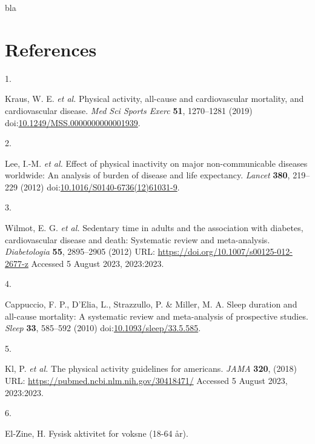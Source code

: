 \documentclass[
  9pt,
]{scrbook}
\newlength{\cslhangindent}
\newlength{\csllabelwidth}
\newlength{\cslentryspacingunit} %
\newenvironment{CSLReferences}[2] %
 {%
  \setlength{\parindent}{0pt}
  \ifodd #1
  \let\oldpar\par
  \def\par{\hangindent=\cslhangindent\oldpar}
  \fi
  \setlength{\parskip}{#2\cslentryspacingunit}
 }%
 {}
\newcommand{\CSLLeftMargin}[1]{\parbox[t]{\csllabelwidth}{#1}}
\newcommand{\CSLRightInline}[1]{\parbox[t]{\linewidth - \csllabelwidth}{#1}\break}
\begin{document}
bla

\hypertarget{references}{%
\chapter{References}\label{references}}

\hypertarget{refs}{}
\begin{CSLReferences}{0}{0}
\leavevmode{}%
\CSLLeftMargin{1. }%
\CSLRightInline{Kraus, W. E. \emph{et al.} Physical activity, all-cause
and cardiovascular mortality, and cardiovascular disease. \emph{Med Sci
Sports Exerc} \textbf{51}, 1270--1281 (2019)
doi:\href{https://doi.org/10.1249/MSS.0000000000001939}{10.1249/MSS.0000000000001939}.}

\leavevmode{}%
\CSLLeftMargin{2. }%
\CSLRightInline{Lee, I.-M. \emph{et al.} Effect of physical inactivity
on major non-communicable diseases worldwide: An analysis of burden of
disease and life expectancy. \emph{Lancet} \textbf{380}, 219--229 (2012)
doi:\href{https://doi.org/10.1016/S0140-6736(12)61031-9}{10.1016/S0140-6736(12)61031-9}.}

\leavevmode{}%
\CSLLeftMargin{3. }%
\CSLRightInline{Wilmot, E. G. \emph{et al.} Sedentary time in adults and
the association with diabetes, cardiovascular disease and death:
Systematic review and meta-analysis. \emph{Diabetologia} \textbf{55},
2895--2905 (2012) URL: \url{https://doi.org/10.1007/s00125-012-2677-z}
Accessed 5 August 2023, 2023:2023.}

\leavevmode{}%
\CSLLeftMargin{4. }%
\CSLRightInline{Cappuccio, F. P., D'Elia, L., Strazzullo, P. \& Miller,
M. A. Sleep duration and all-cause mortality: A systematic review and
meta-analysis of prospective studies. \emph{Sleep} \textbf{33}, 585--592
(2010)
doi:\href{https://doi.org/10.1093/sleep/33.5.585}{10.1093/sleep/33.5.585}.}

\leavevmode{}%
\CSLLeftMargin{5. }%
\CSLRightInline{Kl, P. \emph{et al.} The physical activity guidelines
for americans. \emph{{JAMA}} \textbf{320}, (2018) URL:
\url{https://pubmed.ncbi.nlm.nih.gov/30418471/} Accessed 5 August 2023,
2023:2023.}

\leavevmode{}%
\CSLLeftMargin{6. }%
\CSLRightInline{El-Zine, H. Fysisk aktivitet for voksne (18-64 år).}


\end{CSLReferences}
\end{document}
